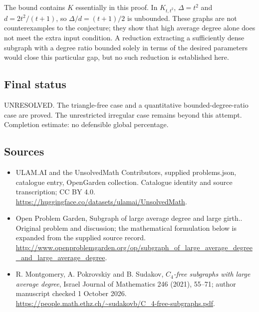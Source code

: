 \documentclass[11pt,a4paper]{article}
\begin{document}
The bound contains $K$ essentially in this proof. In $K_{t,t^2}$,
$\Delta=t^2$ and $d=2t^2/(t+1)$, so $\Delta/d=(t+1)/2$ is unbounded.
These graphs are not counterexamples to the conjecture; they show that
high average degree alone does not meet the extra input condition.
A reduction extracting a sufficiently dense subgraph with a degree
ratio bounded solely in terms of the desired parameters would close
this particular gap, but no such reduction is established here.

\subsection{Final status}
UNRESOLVED. The triangle-free case and a quantitative bounded-degree-ratio
case are proved. The unrestricted irregular case remains beyond this
attempt. Completion estimate: no defensible global percentage.

\subsection{Sources}
\begin{itemize}
\item[S1] ULAM.AI and the UnsolvedMath Contributors, supplied problems.json, catalogue entry, OpenGarden collection. Catalogue identity and source transcription; CC BY 4.0.
\url{https://huggingface.co/datasets/ulamai/UnsolvedMath}.
\item[S2] Open Problem Garden, Subgraph of large average degree and large girth.. Original problem and discussion; the mathematical formulation below is expanded from the supplied source record.
\url{http://www.openproblemgarden.org/op/subgraph_of_large_average_degree_and_large_average_degree}.
\item[S3] R. Montgomery, A. Pokrovskiy and B. Sudakov, \emph{$C_4$-free subgraphs with large average degree}, Israel Journal of Mathematics 246 (2021), 55--71; author manuscript checked 1 October 2026.
\url{https://people.math.ethz.ch/~sudakovb/C_4-free-subgraphs.pdf}.
\end{itemize}
\end{document}
